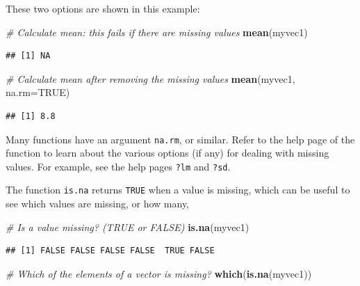 \documentclass[]{book}
\newenvironment{Shaded}{\begin{snugshade}}{\end{snugshade}}
\newcommand{\CommentTok}[1]{\textcolor[rgb]{0.56,0.35,0.01}{\textit{#1}}}
\newcommand{\DataTypeTok}[1]{\textcolor[rgb]{0.13,0.29,0.53}{#1}}
\newcommand{\KeywordTok}[1]{\textcolor[rgb]{0.13,0.29,0.53}{\textbf{#1}}}
\newcommand{\NormalTok}[1]{#1}
\newcommand{\OtherTok}[1]{\textcolor[rgb]{0.56,0.35,0.01}{#1}}
\begin{document}
These two options are shown in this example:

\begin{Shaded}
\begin{Highlighting}[]
\CommentTok{# Calculate mean: this fails if there are missing values}
\KeywordTok{mean}\NormalTok{(myvec1)}
\end{Highlighting}
\end{Shaded}

\begin{verbatim}
## [1] NA
\end{verbatim}

\begin{Shaded}
\begin{Highlighting}[]
\CommentTok{# Calculate mean after removing the missing values}
\KeywordTok{mean}\NormalTok{(myvec1, }\DataTypeTok{na.rm=}\OtherTok{TRUE}\NormalTok{)}
\end{Highlighting}
\end{Shaded}

\begin{verbatim}
## [1] 8.8
\end{verbatim}

Many functions have an argument \texttt{na.rm}, or similar. Refer to the help page of the function to learn about the various options (if any) for dealing with missing values. For example, see the help pages \texttt{?lm} and \texttt{?sd}.

The function \texttt{is.na} returns \texttt{TRUE} when a value is missing, which can be useful to see which values are missing, or how many,

\begin{Shaded}
\begin{Highlighting}[]
\CommentTok{# Is a value missing? (TRUE or FALSE)}
\KeywordTok{is.na}\NormalTok{(myvec1)}
\end{Highlighting}
\end{Shaded}

\begin{verbatim}
## [1] FALSE FALSE FALSE FALSE  TRUE FALSE
\end{verbatim}

\begin{Shaded}
\begin{Highlighting}[]
\CommentTok{# Which of the elements of a vector is missing?}
\KeywordTok{which}\NormalTok{(}\KeywordTok{is.na}\NormalTok{(myvec1))}
\end{Highlighting}
\end{Shaded}
\end{document}
